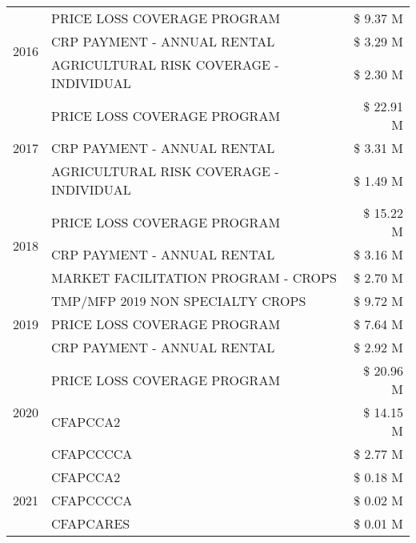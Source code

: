 \begin{tabular}{llr}
\cline{1-3}
\multirow[t]{3}{*}{2016} & PRICE LOSS COVERAGE PROGRAM & \$ 9.37 M \\
 & CRP PAYMENT - ANNUAL RENTAL & \$ 3.29 M \\
 & AGRICULTURAL RISK COVERAGE - INDIVIDUAL & \$ 2.30 M \\
\cline{1-3}
\multirow[t]{3}{*}{2017} & PRICE LOSS COVERAGE PROGRAM & \$ 22.91 M \\
 & CRP PAYMENT - ANNUAL RENTAL & \$ 3.31 M \\
 & AGRICULTURAL RISK COVERAGE - INDIVIDUAL & \$ 1.49 M \\
\cline{1-3}
\multirow[t]{3}{*}{2018} & PRICE LOSS COVERAGE PROGRAM & \$ 15.22 M \\
 & CRP PAYMENT - ANNUAL RENTAL & \$ 3.16 M \\
 & MARKET FACILITATION PROGRAM - CROPS & \$ 2.70 M \\
\cline{1-3}
\multirow[t]{3}{*}{2019} & TMP/MFP 2019 NON SPECIALTY CROPS & \$ 9.72 M \\
 & PRICE LOSS COVERAGE PROGRAM & \$ 7.64 M \\
 & CRP PAYMENT - ANNUAL RENTAL & \$ 2.92 M \\
\cline{1-3}
\multirow[t]{3}{*}{2020} & PRICE LOSS COVERAGE PROGRAM & \$ 20.96 M \\
 & CFAPCCA2 & \$ 14.15 M \\
 & CFAPCCCCA & \$ 2.77 M \\
\cline{1-3}
\multirow[t]{3}{*}{2021} & CFAPCCA2 & \$ 0.18 M \\
 & CFAPCCCCA & \$ 0.02 M \\
 & CFAPCARES & \$ 0.01 M \\
\cline{1-3}
\bottomrule
\end{tabular}
